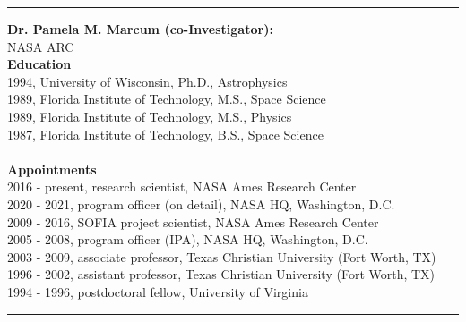 \medskip \hrule \vspace{5pt} \medskip
\textbf{\color{Blue}\large Dr. Pamela M. Marcum (co-Investigator):}\\
NASA ARC\\
\medskip
\textbf{Education}\\
1994, University of Wisconsin, Ph.D., Astrophysics\\
1989, Florida Institute of Technology, M.S., Space Science\\
1989, Florida Institute of Technology, M.S., Physics\\
1987, Florida Institute of Technology, B.S., Space Science\\
\\
\textbf{Appointments}\\
2016 - present, research scientist, NASA Ames Research Center\\
2020 - 2021, program officer (on detail), NASA HQ, Washington, D.C.\\
2009 - 2016, SOFIA project scientist, NASA Ames Research Center\\
2005 - 2008, program officer (IPA), NASA HQ, Washington, D.C.\\
2003 - 2009, associate professor, Texas Christian University (Fort Worth, TX)\\
1996 - 2002, assistant professor, Texas Christian University (Fort Worth, TX)\\
1994 - 1996, postdoctoral fellow, University of Virginia\\
\medskip \hrule \vspace{5pt} \medskip